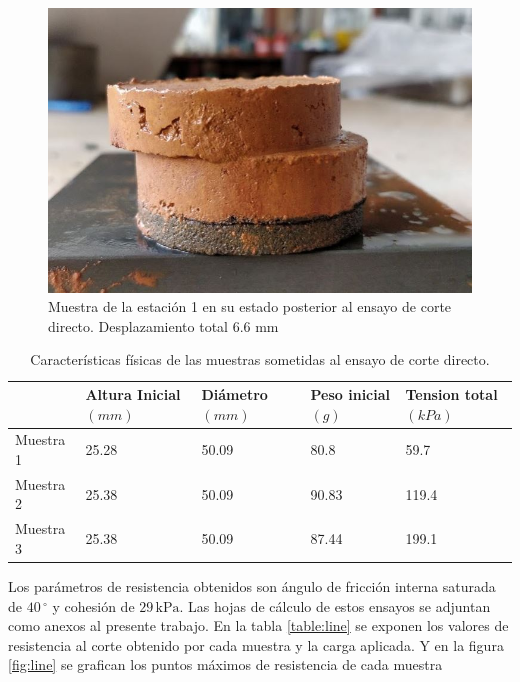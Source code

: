 \begin{figure}[H]
\centering
\includegraphics[scale=1]{img/fallada.jpg}
\caption{Muestra de la estaci\'on 1 en su estado posterior al ensayo de corte directo.  Desplazamiento total 6.6 mm}
\label{fig:toma-bloque}
\end{figure}


\begin{table}[H]
\centering
\caption{Caracter\'isticas f\'isicas de las muestras sometidas al ensayo de corte directo. }
\begin{tabular}{l|l|l|l|l|}
\cline{2-5}
                                & Altura Inicial $\left( mm \right) $ &  Di\'ametro $\left( mm \right) $ & Peso inicial $\left( g \right) $ & Tension total$\left( kPa \right) $ \\ \hline
\multicolumn{1}{|l|}{Muestra 1} & 25.28          & 50.09    & 80.8             & 59.7               \\ \hline
\multicolumn{1}{|l|}{Muestra 2} & 25.38          & 50.09    & 90.83            & 119.4              \\ \hline
\multicolumn{1}{|l|}{Muestra 3} & 25.38          & 50.09    & 87.44            & 199.1              \\ \hline
\end{tabular}
\end{table}



Los par\'ametros de resistencia obtenidos son \'angulo de fricci\'on interna saturada de \(40\,^\circ\) y cohesi\'on de \(29\,\text{kPa}\). Las hojas de c\'alculo de estos ensayos se adjuntan como anexos al presente trabajo.
En la tabla \ref{table:line}  se exponen los valores de resistencia al corte obtenido por cada muestra  y la carga aplicada. Y en la figura \ref{fig:line} se grafican los puntos m\'aximos de resistencia de cada muestra



